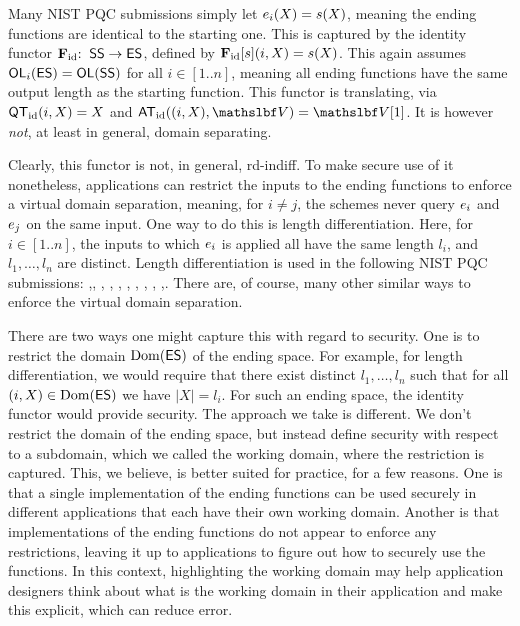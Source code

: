
 Many NIST PQC submissions simply let $e_i(X)  = s(X)$, meaning the ending functions are identical to the starting one. This is captured by the identity functor $\mathbf{F}_{\mathrm{id}}
{:\;\;} \mathsf{SS} \to \mathsf{ES}$, defined by $\mathbf{F}_{\mathrm{id}}[s](i,X) = s(X)$. This again assumes $\mathsf{OL}_i(\mathsf{ES})=\mathsf{OL}(\mathsf{SS})$ for all $i\in [1..n]$, meaning all ending functions have the same output length as the starting function. This functor is translating, via $\mathsf{QT}_{\mathrm{id}}(i,X)=X$ and $\IdanswerRO((i,X),\vecV)=\vecV[1]$.
It is however \textit{not}, at least in general, domain separating.

Clearly, this functor is not, in general, rd-indiff. To make secure use of it nonetheless, applications can restrict the inputs to the ending functions to enforce a virtual domain separation, meaning, for $i\neq j$, the schemes never query $e_i$ and $e_j$ on the same input. One way to do this is length differentiation. Here, for $i\in [1..n]$, the inputs to which $e_i$ is applied all have the same length $l_i$, and $l_1,\ldots,l_n$ are distinct. Length differentiation is used in the following NIST PQC submissions: ,, , , , , , , , ,. There are, of course, many other similar ways to enforce the virtual domain separation.

There are two ways one might capture this with regard to security. One is to restrict the domain $\mathrm{Dom}(\mathsf{ES})$ of the ending space. For example, for length differentiation, we would require that there exist distinct $l_1,\ldots,l_n$ such that for all $(i,X)\in \mathrm{Dom}(\mathsf{ES})$ we have $|X|=l_i$. For such an ending space, the identity functor would provide security. The approach we take is different. We don't restrict the domain of the ending space, but instead define security with respect to a subdomain, which we called the working domain, where the restriction is captured. This, we believe, is better suited for practice, for a few reasons. One is that a single implementation of the ending functions can be used securely in different applications that each have their own working domain. Another is that implementations of the ending functions do not appear to enforce any restrictions, leaving it up to applications to figure out how to securely use the functions. In this context, highlighting the working domain may help application designers think about what is the working domain in their application and make this explicit, which can reduce error. 

